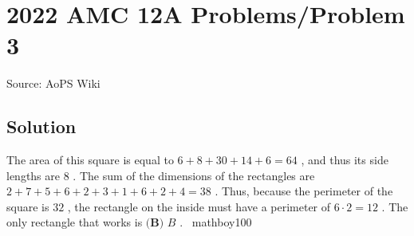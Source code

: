\documentclass[12pt]{article}
\begin{document}
\section*{{2022 AMC 12A Problems/Problem 3}}
Source: AoPS Wiki

\subsection*{Solution}
The area of this square is equal to $6 + 8 + 30 + 14 + 6 = 64$ , and thus its side lengths are $8$ . The sum of the dimensions of the rectangles are $2 + 7 + 5 + 6 + 2 + 3 + 1 + 6 + 2 + 4 = 38$ . Thus, because the perimeter of the square is $32$ , the rectangle on the inside must have a perimeter of $6 \cdot 2 = 12$ . The only rectangle that works is $\boxed{\textbf{(B) }B}$ . ~mathboy100
\end{document}
